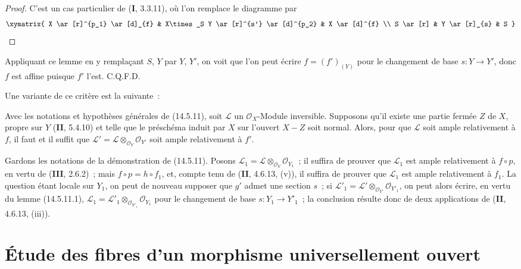 
\begin{proof}
C'est un cas particulier de (\textbf{I}, 3.3.11), où l'on remplace le diagramme par
\[
  \xymatrix{
    X \ar[r]^{p_1} \ar[d]_{f} & X\times_S Y \ar[r]^{s'} \ar[d]^{p_2} & X \ar[d]^{f} \\
    S \ar[r] & Y \ar[r]_{s} & S
  }
\]
\end{proof}

Appliquant ce lemme en y remplaçant $S$, $Y$ par $Y$, $Y'$, on voit que l'on peut
écrire $f=(f')_{(Y)}$ pour le changement de base $s:Y\to Y'$, donc $f$ est affine
puisque $f'$ l'est. C.Q.F.D.

Une variante de ce critère est la suivante~:

\begin{corollary}[14.5.12]
\label{IV.14.5.12-fr}
Avec les notations et hypothèses générales de (14.5.11), soit $\mathcal L$ un
$\mathcal O_X$-Module inversible. Supposons qu'il existe une partie fermée $Z$ de
$X$, propre sur $Y$ (\textbf{II}, 5.4.10) et telle que le préschéma induit par $X$
sur l'ouvert $X-Z$ soit normal. Alors, pour que $\mathcal L$ soit ample relativement
à $f$, il faut et il suffit que
$\mathcal L'=\mathcal L\otimes_{\mathcal O_Y}\mathcal O_{Y'}$ soit ample
relativement à $f'$.
\end{corollary}

Gardons les notations de la démonstration de (14.5.11). Posons
$\mathcal L_1=\mathcal L\otimes_{\mathcal O_Y}\mathcal O_{Y_1}$~; il suffira de
prouver que $\mathcal L_1$ est ample relativement à $f\circ p$, en vertu de
(\textbf{III}, 2.6.2)~; mais $f\circ p=h\circ f_1$, et, compte tenu de
(\textbf{II}, 4.6.13, (v)), il suffira de prouver que $\mathcal L_1$ est ample
relativement à $f_1$. La question étant locale sur $Y_1$, on peut de nouveau
supposer que $g'$ admet une section $s$~; si
$\mathcal L'_1=\mathcal L'\otimes_{\mathcal O_{Y'}}\mathcal O_{Y'_1}$, on peut
alors écrire, en vertu du lemme (14.5.11.1),
$\mathcal L_1=\mathcal L'_1\otimes_{\mathcal O_{Y'_1}}\mathcal O_{Y_1}$ pour le
changement de base $s:Y_1\to Y'_1$~; la conclusion résulte donc de deux
applications de (\textbf{II}, 4.6.13, (iii)).


\section{Étude des fibres d'un morphisme universellement ouvert}
\label{section:IV.15-fr}

